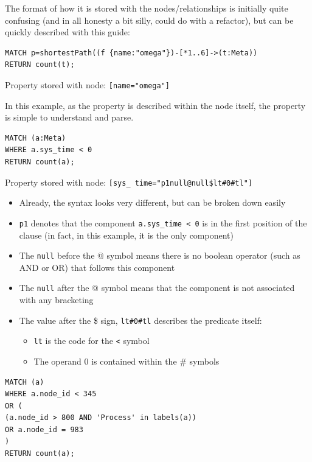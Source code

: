 \documentclass[letterpaper]{ltxdoc}
\begin{document}
The format of how it is stored with the nodes/relationships is initially quite confusing (and in all honesty a bit silly, could do with a refactor), but can be quickly described with this guide:

\bigskip

\begin{lstlisting}[language=Cypher]
MATCH p=shortestPath((f {name:"omega"})-[*1..6]->(t:Meta))
RETURN count(t);
\end{lstlisting}

Property stored with node: \texttt{[name="omega"]}

In this example, as the property is described within the node itself, the property is simple to understand and parse.

\bigskip

\begin{lstlisting}[language=Cypher]
MATCH (a:Meta)
WHERE a.sys_time < 0
RETURN count(a);
\end{lstlisting}

Property stored with node: \texttt{[sys\_ time="p1null@null\$lt\#0\#tl"]}

\begin{itemize}
\item Already, the syntax looks very different, but can be broken down easily
\item \texttt{p1} denotes that the component \texttt{a.sys\_time < 0} is in the first position of the clause (in fact, in this example, it is the only component)
\item The \texttt{null} before the @ symbol means there is no boolean operator (such as AND or OR) that follows this component
\item The \texttt{null} after the @ symbol means that the component is not associated with any bracketing
\item The value after the \$ sign, \texttt{lt\#0\#tl} describes the predicate itself:
\begin{itemize}
\item \texttt{lt} is the code for the \texttt{<} symbol
\item The operand 0 is contained within the \# symbols
\end{itemize}
\end{itemize}

\bigskip

\begin{lstlisting}[language=Cypher]
MATCH (a)
WHERE a.node_id < 345
OR (
(a.node_id > 800 AND 'Process' in labels(a))
OR a.node_id = 983
)
RETURN count(a);
\end{lstlisting}
\end{document}
